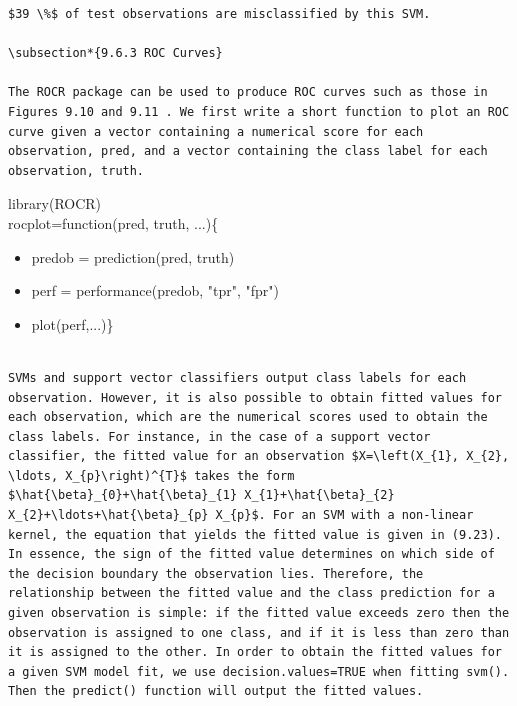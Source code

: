 \documentclass[10pt]{article}
\begin{document}
\begin{verbatim}
$39 \%$ of test observations are misclassified by this SVM.

\subsection*{9.6.3 ROC Curves}

The ROCR package can be used to produce ROC curves such as those in Figures 9.10 and 9.11 . We first write a short function to plot an ROC curve given a vector containing a numerical score for each observation, pred, and a vector containing the class label for each observation, truth.
\end{verbatim}

\begin{displayquote}
library(ROCR)\\
rocplot=function(pred, truth, ...)\{
\end{displayquote}

\begin{itemize}
  \item predob = prediction(pred, truth)
  \item perf = performance(predob, "tpr", "fpr")
  \item plot(perf,...)\}
\end{itemize}

\begin{verbatim}

SVMs and support vector classifiers output class labels for each observation. However, it is also possible to obtain fitted values for each observation, which are the numerical scores used to obtain the class labels. For instance, in the case of a support vector classifier, the fitted value for an observation $X=\left(X_{1}, X_{2}, \ldots, X_{p}\right)^{T}$ takes the form $\hat{\beta}_{0}+\hat{\beta}_{1} X_{1}+\hat{\beta}_{2} X_{2}+\ldots+\hat{\beta}_{p} X_{p}$. For an SVM with a non-linear kernel, the equation that yields the fitted value is given in (9.23). In essence, the sign of the fitted value determines on which side of the decision boundary the observation lies. Therefore, the relationship between the fitted value and the class prediction for a given observation is simple: if the fitted value exceeds zero then the observation is assigned to one class, and if it is less than zero than it is assigned to the other. In order to obtain the fitted values for a given SVM model fit, we use decision.values=TRUE when fitting svm(). Then the predict() function will output the fitted values.
\end{verbatim}
\end{document}
